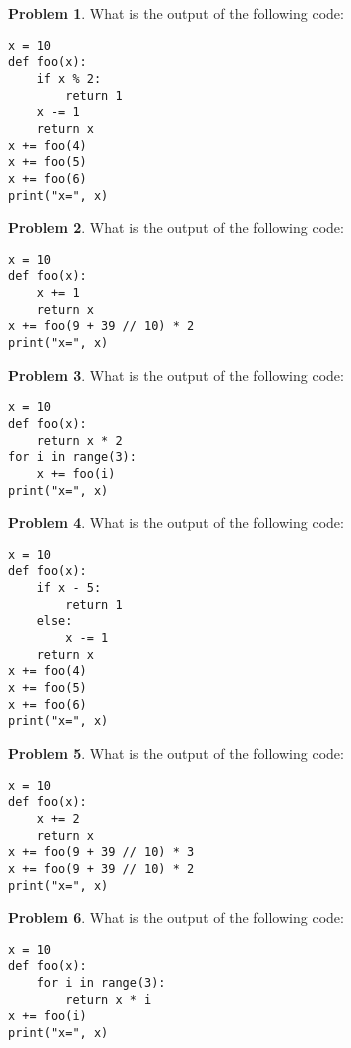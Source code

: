 \documentclass[10pt]{article}
\theoremstyle{definition}
\newtheorem{problem}{Problem}
\begin{document}
\begin{problem}
    What is the output of the following code:
\end{problem}
\begin{lstlisting}
x = 10
def foo(x):
    if x % 2:
        return 1
    x -= 1
    return x
x += foo(4)
x += foo(5)
x += foo(6)
print("x=", x)
\end{lstlisting}
\vspace{0.15in}

\newpage
\begin{problem}
    What is the output of the following code:
\end{problem}
\begin{lstlisting}
x = 10 
def foo(x):
    x += 1
    return x
x += foo(9 + 39 // 10) * 2
print("x=", x)
\end{lstlisting}
\vspace{0.15in}

\begin{problem}
    What is the output of the following code:
\end{problem}
\begin{lstlisting}
x = 10
def foo(x):
    return x * 2
for i in range(3):
    x += foo(i)
print("x=", x)
\end{lstlisting}
\vspace{0.15in}
\begin{problem}
    What is the output of the following code:
\end{problem}
\begin{lstlisting}
x = 10
def foo(x):
    if x - 5:
        return 1
    else:
        x -= 1
    return x
x += foo(4)
x += foo(5)
x += foo(6)
print("x=", x)
\end{lstlisting}
\vspace{0.15in}

\begin{problem}
    What is the output of the following code:
\end{problem}
\begin{lstlisting}
x = 10 
def foo(x):
    x += 2
    return x
x += foo(9 + 39 // 10) * 3
x += foo(9 + 39 // 10) * 2
print("x=", x)
\end{lstlisting}
\vspace{0.15in}

\begin{problem}
    What is the output of the following code:
\end{problem}
\begin{lstlisting}
x = 10
def foo(x):
    for i in range(3):
        return x * i
x += foo(i)
print("x=", x)
\end{lstlisting}
\vspace{0.15in}
\end{document}
